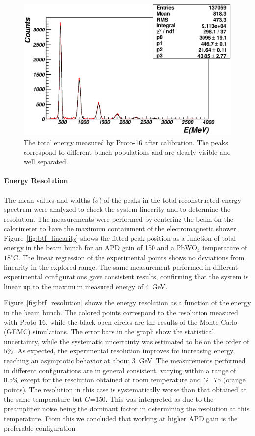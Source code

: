 \begin{figure}
\includegraphics[width=1.0\columnwidth]{./fig/btf_etot_1876_2_6.eps}
\caption{The total energy measured by Proto-16 after calibration. The peaks correspond to different bunch
  populations and are clearly visible and well separated.}
\label{fig:btf_etot}
\end{figure}

\paragraph{Energy Resolution}

The mean values and widths ($\sigma$) of the peaks in the total reconstructed energy spectrum were analyzed to
check the system linearity and to determine the resolution. The measurements were performed by centering the
beam on the calorimeter to have the maximum containment of the electromagnetic shower.
Figure~\ref{fig:btf_linearity} shows the fitted peak position as a function of total energy in the beam bunch for an
APD gain of 150 and a PbWO$_4$ temperature of $18^{\circ}$C. The linear regression of the experimental points
shows no deviations from linearity in the explored range. The same measurement performed in different experimental
configurations gave consistent results, confirming that the system is linear up to the maximum measured energy of
4~GeV.

Figure~\ref{fig:btf_resolution} shows the energy resolution as a function of the energy in the beam bunch. The
colored points correspond to the resolution measured with Proto-16, while the black open circles are the results
of the Monte Carlo (GEMC) simulations. The error bars in the graph show the statistical uncertainty, while the
systematic uncertainty was estimated to be on the order of 5\%.  As expected, the experimental resolution
improves for increasing energy, reaching an asymptotic behavior at about 3~GeV. The measurements performed in
different configurations are in general consistent, varying within a range of 0.5\% except for the resolution obtained
at room temperature and $G$=75 (orange points). The resolution in this case is systematically worse than that
obtained at the same temperature but $G$=150. This was interpreted as due to the preamplifier noise being the
dominant factor in determining the resolution at this temperature. From this we concluded that working at higher
APD gain is the preferable configuration. 

